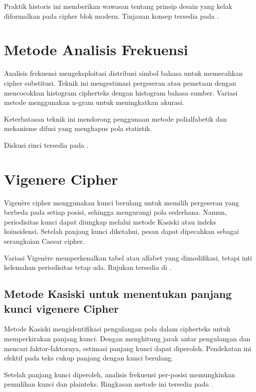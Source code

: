 \documentclass[../main.tex]{subfiles}
\begin{document}
Praktik historis ini memberikan wawasan tentang prinsip desain yang kelak diformalkan pada cipher blok modern. Tinjauan konsep tersedia pada \textcite{menezes1996handbook}.

\section{Metode Analisis Frekuensi}
Analisis frekuensi mengeksploitasi distribusi simbol bahasa untuk memecahkan cipher substitusi. Teknik ini mengestimasi pergeseran atau pemetaan dengan mencocokkan histogram cipherteks dengan histogram bahasa sumber. Variasi metode menggunakan n-gram untuk meningkatkan akurasi.

Keterbatasan teknik ini mendorong penggunaan metode polialfabetik dan mekanisme difusi yang menghapus pola statistik.

Diskusi rinci tersedia pada \textcite{menezes1996handbook}.

\section{Vigenere Cipher}
Vigenère cipher menggunakan kunci berulang untuk memilih pergeseran yang berbeda pada setiap posisi, sehingga mengurangi pola sederhana. Namun, periodisitas kunci dapat diungkap melalui metode Kasiski atau indeks koinsidensi. Setelah panjang kunci diketahui, pesan dapat dipecahkan sebagai serangkaian Caesar cipher.

Variasi Vigenère memperkenalkan tabel atau alfabet yang dimodifikasi, tetapi inti kelemahan periodisitas tetap ada. Rujukan tersedia di \textcite{menezes1996handbook}.

\subsection{Metode Kasiski untuk menentukan panjang kunci vigenere Cipher}
Metode Kasiski mengidentifikasi pengulangan pola dalam cipherteks untuk memperkirakan panjang kunci. Dengan menghitung jarak antar pengulangan dan mencari faktor-faktornya, estimasi panjang kunci dapat diperoleh. Pendekatan ini efektif pada teks cukup panjang dengan kunci berulang.

Setelah panjang kunci diperoleh, analisis frekuensi per-posisi memungkinkan pemulihan kunci dan plainteks. Ringkasan metode ini tersedia pada \textcite{menezes1996handbook}.
\end{document}
